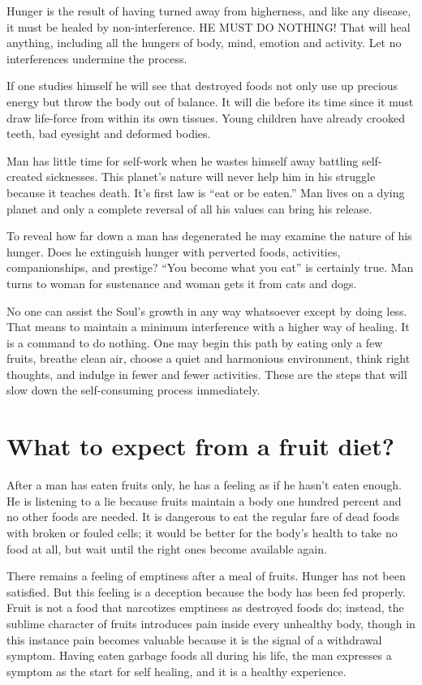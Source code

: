 \documentclass[12pt,letterpaper]{article}
\begin{document}
Hunger is the result of having turned away from higherness, and like
any disease, it must be healed by non-interference. HE MUST DO
NOTHING! That will heal anything, including all the hungers of body,
mind, emotion and activity.  Let no interferences undermine the
process.

If one studies himself he will see that destroyed foods not only use
up precious energy but throw the body out of balance. It will die
before its time since it must draw life-force from within its own
tissues. Young children have already crooked teeth, bad eyesight and
deformed bodies.

Man has little time for self-work when he wastes himself away battling
self-created sicknesses. This planet's nature will never help him in
his struggle because it teaches death. It's first law is ``eat or be
eaten.'' Man lives on a dying planet and only a complete reversal of
all his values can bring his release.

To reveal how far down a man has degenerated he may examine the nature
of his hunger. Does he extinguish hunger with perverted foods,
activities, companionships, and prestige? ``You become what you eat''
is certainly true.  Man turns to woman for sustenance and woman gets
it from cats and dogs.

No one can assist the Soul's growth in any way whatsoever except by
doing less. That means to maintain a minimum interference with a
higher way of healing. It is a command to do nothing. One may begin
this path by eating only a few fruits, breathe clean air, choose a
quiet and harmonious environment, think right thoughts, and indulge in
fewer and fewer activities. These are the steps that will slow down
the self-consuming process immediately.


\section{What to expect from a fruit diet?}

After a man has eaten fruits only, he has a feeling as if he hasn't
eaten enough. He is listening to a lie because fruits maintain a body
one hundred percent and no other foods are needed. It is dangerous to
eat the regular fare of dead foods with broken or fouled cells; it
would be better for the body's health to take no food at all, but wait
until the right ones become available again.

There remains a feeling of emptiness after a meal of fruits. Hunger
has not been satisfied. But this feeling is a deception because the
body has been fed properly. Fruit is not a food that narcotizes
emptiness as destroyed foods do; instead, the sublime character of
fruits introduces pain inside every unhealthy body, though in this
instance pain becomes valuable because it is the signal of a
withdrawal symptom. Having eaten garbage foods all during his life,
the man expresses a symptom as the start for self healing, and it is a
healthy experience.
\end{document}
